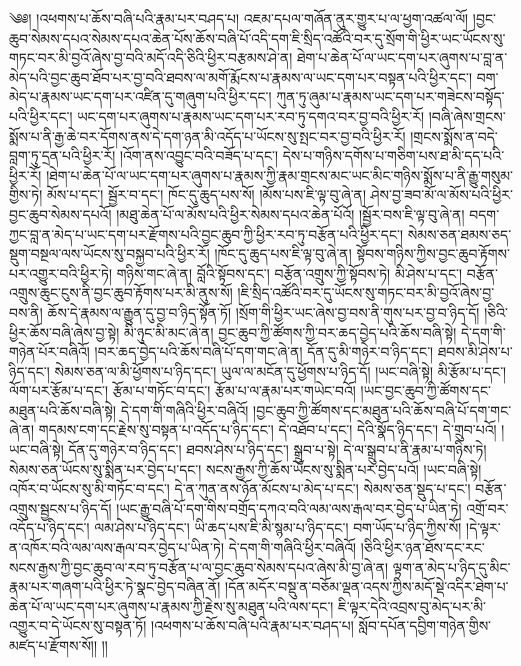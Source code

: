 ༄༅། །འཕགས་པ་ཆོས་བཞི་པའི་རྣམ་པར་བཤད་པ། འཇམ་དཔལ་གཞོན་ནུར་གྱུར་པ་ལ་ཕྱག་འཚལ་ལོ། །བྱང་ཆུབ་སེམས་དཔའ་སེམས་དཔའ་ཆེན་པོས་ཆོས་བཞི་པོ་འདི་དག་ཇི་སྲིད་འཚོའི་བར་དུ་སྲོག་གི་ཕྱིར་ཡང་ཡོངས་སུ་གཏང་བར་མི་བྱའོ་ཞེས་བྱ་བའི་མདོ་འདི་ཅིའི་ཕྱིར་བརྩམས་ཤེ་ན། ཐེག་པ་ཆེན་པོ་ལ་ཡང་དག་པར་ཞུགས་པ་བླ་ན་མེད་པའི་བྱང་ཆུབ་ཐོབ་པར་བྱ་བའི་ཐབས་ལ་མགོ་རྨོངས་པ་རྣམས་ལ་ཡང་དག་པར་བསྟན་པའི་ཕྱིར་དང་། བག་མེད་པ་རྣམས་ཡང་དག་པར་འཛིན་དུ་གཞུག་པའི་ཕྱིར་དང་། ཀུན་ཏུ་ཞུམ་པ་རྣམས་ཡང་དག་པར་གཟེངས་བསྟོད་པའི་ཕྱིར་དང་། ཡང་དག་པར་ཞུགས་པ་རྣམས་ཡང་དག་པར་རབ་ཏུ་དགའ་བར་བྱ་བའི་ཕྱིར་རོ། །བཞི་ཞེས་གྲངས་སྨོས་པ་ནི་རྒྱ་ཆེ་བར་དོགས་ནས་དེ་དག་ཉན་མི་འདོད་པ་ཡོངས་སུ་སྤང་བར་བྱ་བའི་ཕྱིར་རོ། །གྲངས་སྨོས་ན་བདེ་བླག་ཏུ་དྲན་པའི་ཕྱིར་རོ། །འོག་ནས་འབྱུང་བའི་བཟོད་པ་དང་། དེས་པ་གཉིས་དགོས་པ་གཅིག་པས་ཐ་མི་དད་པའི་ཕྱིར་རོ། །ཐེག་པ་ཆེན་པོ་ལ་ཡང་དག་པར་ཞུགས་པ་རྣམས་ཀྱི་རྣམ་གྲངས་མང་ཡང་མིང་གཉིས་སྨོས་པ་ནི་རྒྱུ་གསུམ་གྱིས་ཏེ། མོས་པ་དང་། སྦྱོར་བ་དང་། ཁོང་དུ་ཆུད་པས་སོ། །མོས་པས་ཇི་ལྟ་བུ་ཞེ་ན། ཤེས་བྱ་ཟབ་མོ་ལ་མོས་པའི་ཕྱིར་བྱང་ཆུབ་སེམས་དཔའོ། །མཐུ་ཆེན་པོ་ལ་མོས་པའི་ཕྱིར་སེམས་དཔའ་ཆེན་པོའོ། །སྦྱོར་བས་ཇི་ལྟ་བུ་ཞེ་ན། བདག་ཀྱང་བླ་ན་མེད་པ་ཡང་དག་པར་རྫོགས་པའི་བྱང་ཆུབ་ཀྱི་ཕྱིར་རབ་ཏུ་བརྩོན་པའི་ཕྱིར་དང་། སེམས་ཅན་ཐམས་ཅད་སྡུག་བསྔལ་ལས་ཡོངས་སུ་བསྐྱབ་པའི་ཕྱིར་རོ། །ཁོང་དུ་ཆུད་པས་ཇི་ལྟ་བུ་ཞེ་ན། སྟོབས་གཉིས་ཀྱིས་བྱང་ཆུབ་རྟོགས་པར་འགྱུར་བའི་ཕྱིར་ཏེ། གཉིས་གང་ཞེ་ན། བློའི་སྟོབས་དང་། བརྩོན་འགྲུས་ཀྱི་སྟོབས་ཏེ། མི་ཤེས་པ་དང་། བརྩོན་འགྲུས་ཆུང་ངུས་ནི་བྱང་ཆུབ་རྟོགས་པར་མི་ནུས་སོ། །ཇི་སྲིད་འཚོའི་བར་དུ་ཡོངས་སུ་གཏང་བར་མི་བྱའོ་ཞེས་བྱ་བས་ནི། ཆོས་དེ་རྣམས་ལ་རྒྱུན་དུ་བྱ་བ་ཉིད་སྟོན་ཏོ། །སྲོག་གི་ཕྱིར་ཡང་ཞེས་བྱ་བས་ནི་གུས་པར་བྱ་བ་ཉིད་དོ། །ཅིའི་ཕྱིར་ཆོས་བཞི་ཞེས་བྱ་སྟེ། མི་ཉུང་མི་མང་ཞེ་ན། བྱང་ཆུབ་ཀྱི་ཚོགས་ཀྱི་བར་ཆད་བྱེད་པའི་ཆོས་བཞི་སྟེ། དེ་དག་གི་གཉེན་པོར་བཞིའོ། །བར་ཆད་བྱེད་པའི་ཆོས་བཞི་པོ་དག་གང་ཞེ་ན། དོན་དུ་མི་གཉེར་བ་ཉིད་དང་། ཐབས་མི་ཤེས་པ་ཉིད་དང་། སེམས་ཅན་ལ་མི་ཕྱོགས་པ་ཉིད་དང་། ཡུལ་ལ་མངོན་དུ་ཕྱོགས་པ་ཉིད་དོ། །ཡང་བཞི་སྟེ། མི་རྩོམ་པ་དང་། ལོག་པར་རྩོམ་པ་དང་། རྩོམ་པ་གཏོང་བ་དང་། རྩོམ་པ་ལ་རྣམ་པར་གཡེང་བའོ། །ཡང་བྱང་ཆུབ་ཀྱི་ཚོགས་དང་མཐུན་པའི་ཆོས་བཞི་སྟེ། དེ་དག་གི་གཞིའི་ཕྱིར་བཞིའོ། །བྱང་ཆུབ་ཀྱི་ཚོགས་དང་མཐུན་པའི་ཆོས་བཞི་པོ་དག་གང་ཞེ་ན། གདམས་ངག་དང་རྗེས་སུ་བསྟན་པ་འདོད་པ་ཉིད་དང་། དེ་འཐོབ་པ་དང་། དེའི་སྣོད་ཉིད་དང་། དེ་གྲུབ་པའོ། །ཡང་བཞི་སྟེ། དོན་དུ་གཉེར་བ་ཉིད་དང་། ཐབས་ཤེས་པ་ཉིད་དང་། སྒྲུབ་པ་སྟེ། དེ་ལ་སྒྲུབ་པ་ནི་རྣམ་པ་གཉིས་ཏེ། སེམས་ཅན་ཡོངས་སུ་སྨིན་པར་བྱེད་པ་དང་། སངས་རྒྱས་ཀྱི་ཆོས་ཡོངས་སུ་སྨིན་པར་བྱེད་པའོ། །ཡང་བཞི་སྟེ། འཁོར་བ་ཡོངས་སུ་མི་གཏོང་བ་དང་། དེ་ན་ཀུན་ནས་ཉོན་མོངས་པ་མེད་པ་དང་། སེམས་ཅན་སྡུད་པ་དང་། བརྩོན་འགྲུས་སྦྱངས་པ་ཉིད་དོ། །ཡང་རྒྱུ་བཞི་པོ་དག་གིས་བགྲོད་དཀའ་བའི་ལམ་ལས་རྒལ་བར་བྱེད་པ་ཡིན་ཏེ། འགྲོ་བར་འདོད་པ་ཉིད་དང་། ལམ་ཤེས་པ་ཉིད་དང་། ཡི་ཆད་པས་ཇི་མི་སྙམ་པ་ཉིད་དང་། བག་ཡོད་པ་ཉིད་ཀྱིས་སོ། །དེ་ལྟར་ན་འཁོར་བའི་ལམ་ལས་རྒལ་བར་བྱེད་པ་ཡིན་ཏེ། དེ་དག་གི་གཞིའི་ཕྱིར་བཞིའོ། །ཅིའི་ཕྱིར་ཉན་ཐོས་དང་རང་སངས་རྒྱས་ཀྱི་བྱང་ཆུབ་ལ་རབ་ཏུ་བརྩོན་པ་ལ་བྱང་ཆུབ་སེམས་དཔའ་ཞེས་མི་བྱ་ཞེ་ན། ལྟག་ན་མེད་པ་ཉིད་དུ་མིང་རྣམ་པར་གཞག་པའི་ཕྱིར་ཏེ་སྣང་བྱེད་བཞིན་ནོ། །དོན་མདོར་བསྡུ་ན་བཅོམ་ལྡན་འདས་ཀྱིས་མདོ་སྡེ་འདིར་ཐེག་པ་ཆེན་པོ་ལ་ཡང་དག་པར་ཞུགས་པ་རྣམས་ཀྱི་རྗེས་སུ་མཐུན་པའི་ལས་དང་། ཇི་ལྟར་དེའི་འབྲས་བུ་མེད་པར་མི་འགྱུར་བ་དེ་ཡོངས་སུ་བསྟན་ཏོ། །འཕགས་པ་ཆོས་བཞི་པའི་རྣམ་པར་བཤད་པ། སློབ་དཔོན་དབྱིག་གཉེན་གྱིས་མཛད་པ་རྫོགས་སོ།། །།